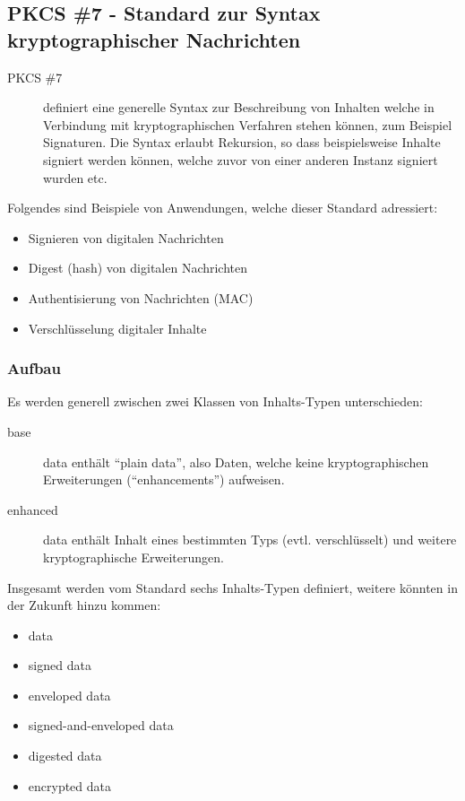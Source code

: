 \documentclass[10pt,a4paper]{article}
\begin{document}
\subsection{PKCS \#7 - Standard zur Syntax kryptographischer Nachrichten}

\begin{description}
    \item[PKCS \#7] definiert eine generelle Syntax zur Beschreibung von Inhalten welche in
        Verbindung mit kryptographischen Verfahren stehen können, zum Beispiel Signaturen.
        Die Syntax erlaubt Rekursion, so dass beispielsweise Inhalte signiert werden
        können, welche zuvor von einer anderen Instanz signiert wurden etc.
\end{description}

Folgendes sind Beispiele von Anwendungen, welche dieser Standard adressiert:
\begin{itemize}
    \item Signieren von digitalen Nachrichten
    \item Digest (hash) von digitalen Nachrichten
    \item Authentisierung von Nachrichten (MAC)
    \item Verschlüsselung digitaler Inhalte
\end{itemize}

\subsubsection{Aufbau}

Es werden generell zwischen zwei Klassen von Inhalts-Typen unterschieden:
\begin{description}
    \item[base] data enthält "`plain data"', also Daten, welche keine kryptographischen
        Erweiterungen ("`enhancements"') aufweisen.
    \item[enhanced] data enthält Inhalt eines bestimmten Typs (evtl. verschlüsselt) und
        weitere kryptographische Erweiterungen.
\end{description}

Insgesamt werden vom Standard sechs Inhalts-Typen definiert, weitere könnten in der
Zukunft hinzu kommen:
\label{list:content-types}
\begin{itemize}
    \item data
    \item signed data
    \item enveloped data
    \item signed-and-enveloped data
    \item digested data
    \item encrypted data
\end{itemize}
\end{document}
